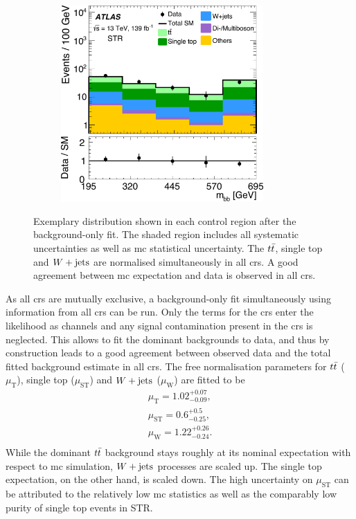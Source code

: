 \begin{figure}
\begin{subfigure}[b]{0.5\linewidth}
		\centering\includegraphics[width=0.85\textwidth]{OneLeptonbb_CR_STCREM_mbb_yellow}
	\end{subfigure}\hfill

	\caption{Exemplary distribution shown in each control region after the background-only fit. The shaded region includes all systematic uncertainties as well as \gls{mc} statistical uncertainty. The $t\bar{t}$, single top and $W+\mathrm{jets}$ are normalised simultaneously in all \glspl{cr}. A good agreement between \gls{mc} expectation and data is observed in all \glspl{cr}.}
	\label{fig:CR_distributions_postfit}
\end{figure}



As all \glspl{cr} are mutually exclusive, a background-only fit simultaneously using information from all \glspl{cr} can be run. Only the terms for the \glspl{cr} enter the likelihood as channels and any signal contamination present in the \glspl{cr} is neglected. This allows to fit the dominant backgrounds to data, and thus by construction leads to a good agreement between observed data and the total fitted background estimate in all \glspl{cr}. The free normalisation parameters for $t\bar{t}$ ($\mu_\mathrm{T}$), single top ($\mu_\mathrm{ST}$) and $W+\mathrm{jets}$ ($\mu_\mathrm{W}$) are fitted to be
\begin{equation}
	\begin{split}
		\mu_\mathrm{T} = 1.02^{+0.07}_{-0.09}, \\
		\mu_\mathrm{ST} = 0.6^{+0.5}_{-0.25}, \\
		\mu_\mathrm{W} = 1.22^{+0.26}_{-0.24}. \\
	\end{split}
\end{equation}
While the dominant $t\bar{t}$ background stays roughly at its nominal expectation with respect to \gls{mc} simulation, $W+\mathrm{jets}$ processes are scaled up. The single top expectation, on the other hand, is scaled down. The high uncertainty on $\mu_\mathrm{ST}$ can be attributed to the relatively low \gls{mc} statistics as well as the comparably low purity of single top events in STR.

